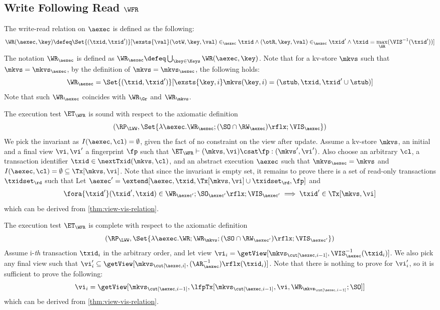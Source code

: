 \subsection{Write Following Read \( \WFR \) }
\label{sec:sound-complete-wfr}

The write-read relation  on \( \aexec \) is defined as the following:
\[
    \WR(\aexec, \key) \defeq \Set{ (\txid, \txid') }[ \exsts{\val} (\otW, \key, \val) \in_\aexec \txid \land (\otR, \key, \val) \in_\aexec \txid' \land \txid = \max_\AR(\VIS^{-1}(\txid')) ]
\]
The notation \( \WR_\aexec \) is defined as \( \WR_\aexec \defeq \bigcup_{\key \in \Keys} \WR(\aexec, \key) \).
Note that for a kv-store \( \mkvs \) such that \( \mkvs = \mkvs_\aexec \),
by the definition of  \(  \mkvs = \mkvs_\aexec \), 
the following holds:
\[
    \WR_\aexec = \Set{(\txid, \txid')}[\exsts{\key, i } \mkvs(\key, i) = (\stub, \txid, \txid'\cup \stub)]
\]
Note that such \( \WR_\aexec \) coincides with \( \WR_\Gr \) and \( \WR_\mkvs \).

The execution test $\ET_\WFR$ is sound with respect to the axiomatic definition \cite{surech-session-guarantee}
\[ (\RP_{\LWW}, \Set{\lambda \aexec. \WR_\aexec ; (\SO \cap \RW_{\aexec} )\rflx ; \VIS_{\aexec} })\]
We pick the invariant as \( I( \aexec, \cl ) = \emptyset \), given the fact of no constraint on the view after update.
Assume a kv-store $\mkvs$, an initial and a final view $\vi, \vi'$  a fingerprint $\fp$ 
such that $\ET_{\WFR} \vdash (\mkvs, \vi) \csat \fp: (\mkvs', \vi')$. 
Also choose an arbitrary $\cl$, a transaction identifier $\txid \in \nextTxid(\mkvs, \cl)$, 
and an abstract execution $\aexec$ such that $\mkvs_{\aexec} = \mkvs$ and 
\( I(\aexec, \cl) =  \emptyset \subseteq \Tx[\mkvs, \vi] \).
Note that since the invariant is empty set, it remains to prove there is a set of read-only transactions \( \txidset_\rd \) such that
Let \( \aexec' = \extend[\aexec, \txid, \Tx[\mkvs, \vi] \cup \txidset_\rd, \fp] \) and
\[
    \begin{array}{@{}l@{}}
        \fora{ \txid' } 
        (\txid' ,\txid)  \in \WR_{\aexec'} ; \SO_{\aexec'}\rflx ; \VIS_{\aexec'} 
        \implies \txid' \in \Tx[\mkvs, \vi]
    \end{array}
\]
which can be derived from \cref{thm:view-vis-relation}.

The execution test $\ET_\WFR$ is complete with respect to the axiomatic definition 
\[ (\RP_{\LWW}, \Set{\lambda \aexec. \WR ; \WR_{\mkvs} ; (\SO \cap \RW_{\aexec'} )\rflx ; \VIS_{\aexec'} })\]
Assume i-\emph{th} transaction \( \txid_i \) in the arbitrary order,
and let view \( \vi_{i} = \getView[\mkvs_{\cut[\aexec, i-1]}, \VIS^{-1}_{\aexec}(\txid_{i})] \).
We also pick any final view such that \( \vi'_{i} \subseteq \getView[\mkvs_{\cut[\aexec, i]}, (\AR^{-1}_{\aexec})\rflx(\txid_{i})] \).
Note that there is nothing to prove for \( \vi'_i \),
so it is sufficient to prove the following:
\[
    \vi_i = \getView[\mkvs_{\cut[\aexec, i-1]}, \lfpTx[\mkvs_{\cut[\aexec, i-1]},\vi,\WR_{\mkvs_{\cut[\aexec, i-1]}}; \SO]]
\]
which can be derived from \cref{thm:view-vis-relation}.

